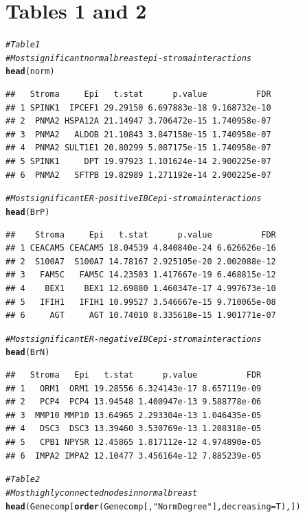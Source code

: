 \documentclass{article}\usepackage[]{graphicx}\usepackage[]{color}
\makeatletter
\newcommand{\hlstr}[1]{\textcolor[rgb]{0.192,0.494,0.8}{#1}}%
\newcommand{\hlcom}[1]{\textcolor[rgb]{0.678,0.584,0.686}{\textit{#1}}}%
\newcommand{\hlstd}[1]{\textcolor[rgb]{0.345,0.345,0.345}{#1}}%
\newcommand{\hlkwc}[1]{\textcolor[rgb]{0.333,0.667,0.333}{#1}}%
\newcommand{\hlkwd}[1]{\textcolor[rgb]{0.737,0.353,0.396}{\textbf{#1}}}%
\newenvironment{kframe}{%
 \def\at@end@of@kframe{}%
 \ifinner\ifhmode%
  \def\at@end@of@kframe{\end{minipage}}%
  \begin{minipage}{\columnwidth}%
 \fi\fi%
 \def\FrameCommand##1{\hskip\@totalleftmargin \hskip-\fboxsep
 \colorbox{shadecolor}{##1}\hskip-\fboxsep
     \hskip-\linewidth \hskip-\@totalleftmargin \hskip\columnwidth}%
 \MakeFramed {\advance\hsize-\width
   \@totalleftmargin\z@ \linewidth\hsize
   \@setminipage}}%
 {\par\unskip\endMakeFramed%
 \at@end@of@kframe}
\newenvironment{knitrout}{}{} %
\makeatother
\begin{document}
\section{ Tables 1 and 2 }
\begin{knitrout}
\color{fgcolor}\begin{kframe}
\begin{alltt}
\hlcom{# Table 1}
\hlcom{# Most significant normal breast epi-stroma interactions}
\hlkwd{head}\hlstd{(norm)}
\end{alltt}
\begin{verbatim}
##   Stroma     Epi   t.stat      p.value          FDR
## 1 SPINK1  IPCEF1 29.29150 6.697883e-18 9.168732e-10
## 2  PNMA2 HSPA12A 21.14947 3.706472e-15 1.740958e-07
## 3  PNMA2   ALDOB 21.10843 3.847158e-15 1.740958e-07
## 4  PNMA2 SULT1E1 20.80299 5.087175e-15 1.740958e-07
## 5 SPINK1     DPT 19.97923 1.101624e-14 2.900225e-07
## 6  PNMA2   SFTPB 19.82989 1.271192e-14 2.900225e-07
\end{verbatim}
\begin{alltt}
\hlcom{# Most significant ER-positive IBC epi-stroma interactions}
\hlkwd{head}\hlstd{(BrP)}
\end{alltt}
\begin{verbatim}
##    Stroma     Epi   t.stat      p.value          FDR
## 1 CEACAM5 CEACAM5 18.04539 4.840840e-24 6.626626e-16
## 2  S100A7  S100A7 14.78167 2.925105e-20 2.002088e-12
## 3   FAM5C   FAM5C 14.23503 1.417667e-19 6.468815e-12
## 4    BEX1    BEX1 12.69880 1.460347e-17 4.997673e-10
## 5   IFIH1   IFIH1 10.99527 3.546667e-15 9.710065e-08
## 6     AGT     AGT 10.74010 8.335618e-15 1.901771e-07
\end{verbatim}
\begin{alltt}
\hlcom{# Most significant ER-negative IBC epi-stroma interactions}
\hlkwd{head}\hlstd{(BrN)}
\end{alltt}
\begin{verbatim}
##   Stroma   Epi   t.stat      p.value          FDR
## 1   ORM1  ORM1 19.28556 6.324143e-17 8.657119e-09
## 2   PCP4  PCP4 13.94548 1.400947e-13 9.588778e-06
## 3  MMP10 MMP10 13.64965 2.293304e-13 1.046435e-05
## 4   DSC3  DSC3 13.39460 3.530769e-13 1.208318e-05
## 5   CPB1 NPY5R 12.45865 1.817112e-12 4.974890e-05
## 6  IMPA2 IMPA2 12.10477 3.456164e-12 7.885239e-05
\end{verbatim}
\begin{alltt}
\hlcom{# Table 2}
\hlcom{# Most highly connected nodes in normal breast}
\hlkwd{head}\hlstd{(Genecomp[}\hlkwd{order}\hlstd{(Genecomp[,}\hlstr{"NormDegree"}\hlstd{],}\hlkwc{decreasing}\hlstd{=T),])}

\end{alltt}
\end{kframe}
\end{knitrout}
\end{document}

